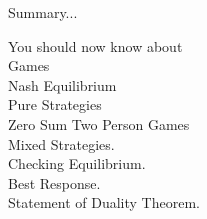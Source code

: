 %
%
%
%
%
%
%
%
%
%
%
%
%
%
%
%
%

\begin{frame}{Summary...}

You should now know about \\ 


Games \\ 
Nash Equilibrium \\ 
Pure Strategies \\ 
Zero Sum Two Person Games \\ 
Mixed Strategies. \\ 
Checking Equilibrium. \\ 
Best Response. \\ 
Statement of Duality Theorem. \\ 

\end{frame}